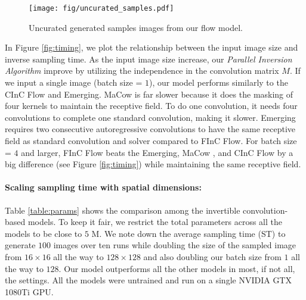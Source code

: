 \documentclass[a4paper,twoside]{article}
\theoremstyle{definition}
\begin{document}
\begin{figure}[!ht]
    \centering
    \texttt{[image: fig/uncurated\_samples.pdf]}
    \caption{Uncurated generated samples images from our flow model.}
    \label{fig:uncurated_samples}
\end{figure}


In Figure \ref{fig:timing}, we plot the relationship between the input image size and inverse sampling time. As the input image size increase, our \emph{Parallel Inversion Algorithm} improve by utilizing the independence in the convolution matrix $M$. If we input a single image (batch size = $1$), our model performs similarly to the CInC Flow and Emerging. MaCow is far slower because it does the masking of four kernels to maintain the receptive field. To do one convolution, it needs four convolutions to complete one standard convolution, making it slower. Emerging requires two consecutive autoregressive convolutions to have the same receptive field as standard convolution and solver compared to FInC Flow. For batch size = $4$ and larger, FInC Flow beats the Emerging, MaCow , and CInC Flow by a big difference (see Figure \ref{fig:timing}) while maintaining the same receptive field. 


\paragraph{Scaling sampling time with spatial dimensions:}
Table \ref{table:params} shows the comparison among the invertible convolution-based models. To keep it fair, we restrict the total parameters across all the models to be close to $5$ M. We note down the average sampling time (ST) to generate $100$ images over ten runs while doubling the size of the sampled image from $16 \times 16$ all the way to $128 \times 128$ and also doubling our batch size from $1$ all the way to $128$. Our model outperforms all the other models in most, if not all, the settings. All the models were untrained and run on a single NVIDIA GTX 1080Ti GPU.
\end{document}

